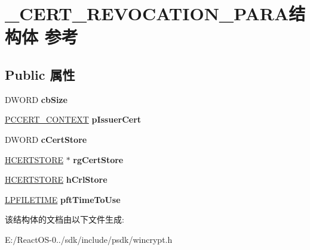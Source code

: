 \hypertarget{struct___c_e_r_t___r_e_v_o_c_a_t_i_o_n___p_a_r_a}{}\section{\+\_\+\+C\+E\+R\+T\+\_\+\+R\+E\+V\+O\+C\+A\+T\+I\+O\+N\+\_\+\+P\+A\+R\+A结构体 参考}
\label{struct___c_e_r_t___r_e_v_o_c_a_t_i_o_n___p_a_r_a}
\subsection*{Public 属性}
\begin{DoxyCompactItemize}
\item 
\mbox{\label{struct___c_e_r_t___r_e_v_o_c_a_t_i_o_n___p_a_r_a_ae287858ee60c695c510589205be152af}} 
D\+W\+O\+RD {\bfseries cb\+Size}
\item 
\mbox{\label{struct___c_e_r_t___r_e_v_o_c_a_t_i_o_n___p_a_r_a_aad2d2d657362bdfb4f4fd8ef5593eb0a}} 
\hyperlink{struct___c_e_r_t___c_o_n_t_e_x_t}{P\+C\+C\+E\+R\+T\+\_\+\+C\+O\+N\+T\+E\+XT} {\bfseries p\+Issuer\+Cert}
\item 
\mbox{\label{struct___c_e_r_t___r_e_v_o_c_a_t_i_o_n___p_a_r_a_ae5b549ea6c7537fd6dddbafe52bed845}} 
D\+W\+O\+RD {\bfseries c\+Cert\+Store}
\item 
\mbox{\label{struct___c_e_r_t___r_e_v_o_c_a_t_i_o_n___p_a_r_a_ae97cd4dd91d57f8846f231778a0515a6}} 
\hyperlink{interfacevoid}{H\+C\+E\+R\+T\+S\+T\+O\+RE} $\ast$ {\bfseries rg\+Cert\+Store}
\item 
\mbox{\label{struct___c_e_r_t___r_e_v_o_c_a_t_i_o_n___p_a_r_a_a505ac29756f14997270c8f63dc90246e}} 
\hyperlink{interfacevoid}{H\+C\+E\+R\+T\+S\+T\+O\+RE} {\bfseries h\+Crl\+Store}
\item 
\mbox{\label{struct___c_e_r_t___r_e_v_o_c_a_t_i_o_n___p_a_r_a_a4270185505d68e6c1a679a4b6d888faf}} 
\hyperlink{struct___f_i_l_e_t_i_m_e}{L\+P\+F\+I\+L\+E\+T\+I\+ME} {\bfseries pft\+Time\+To\+Use}
\end{DoxyCompactItemize}


该结构体的文档由以下文件生成\+:\begin{DoxyCompactItemize}
\item 
E\+:/\+React\+O\+S-\/0../sdk/include/psdk/wincrypt.\+h\end{DoxyCompactItemize}
